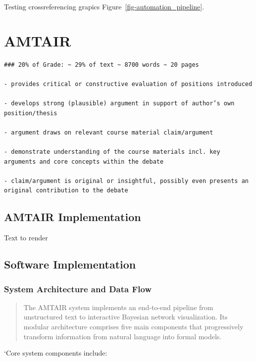 \documentclass[12pt,a4paper]{report}
\begin{document}
Testing crossreferencing grapics Figure~\ref{fig-automation_pipeline}.


\chapter{AMTAIR}\label{amtair}

\begin{verbatim}
### 20% of Grade: ~ 29% of text ~ 8700 words ~ 20 pages

- provides critical or constructive evaluation of positions introduced

- develops strong (plausible) argument in support of author’s own position/thesis

- argument draws on relevant course material claim/argument

- demonstrate understanding of the course materials incl. key arguments and core concepts within the debate

- claim/argument is original or insightful, possibly even presents an original contribution to the debate 
\end{verbatim}

\section{AMTAIR Implementation}\label{sec-amtair-implementation}

Text to render

\section{Software Implementation}\label{sec-software-implementation}

\subsection{System Architecture and Data
Flow}\label{sec-system-architecture}

\begin{quote}
The AMTAIR system implements an end-to-end pipeline from unstructured
text to interactive Bayesian network visualization. Its modular
architecture comprises five main components that progressively transform
information from natural language into formal models.
\end{quote}

`Core system components include:
\end{document}
